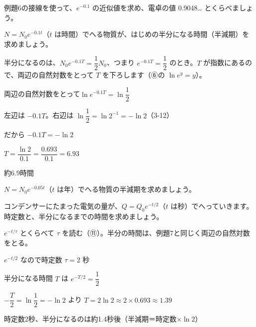 \begin{jibun}
例題6の接線を使って、$e^{-0.1}$ の近似値を求め、電卓の値 0.9048… とくらべましょう。
\end{jibun}

\begin{reidai}[半減期]
$N=N_0e^{-0.1t}$（$t$ は時間）でへる物質が、はじめの半分になる時間（半減期）を求めましょう。\par{}
\kangaekata 半分になるのは、$N_0e^{-0.1T}=\dfrac{1}{2}N_0$、つまり $e^{-0.1T}=\dfrac{1}{2}$ のとき。$T$ が指数にあるので、両辺の自然対数をとって $T$ を下ろします（⑥の $\ln e^y=y$）。\par
\shiki 両辺の自然対数をとって\quad $\ln e^{-0.1T}=\ln\dfrac{1}{2}$\par
\hspace*{2.6\zw}左辺は $-0.1T$。右辺は $\ln\dfrac{1}{2}=\ln2^{-1}=-\ln2$（3-12）\par
\hspace*{2.6\zw}だから $-0.1T=-\ln2$\par
\hspace*{2.6\zw}$T=\dfrac{\ln2}{0.1}=\dfrac{0.693}{0.1}=6.93$\par
\kotae 約6.9時間
\end{reidai}

\begin{jibun}
$N=N_0e^{-0.05t}$（$t$ は年）でへる物質の半減期を求めましょう。
\end{jibun}

\begin{reidai}[時定数]
コンデンサーにたまった電気の量が、$Q=Q_0e^{-t/2}$（$t$ は秒）でへっていきます。時定数と、半分になるまでの時間を求めましょう。\par
\kangaekata $e^{-t/\tau}$ とくらべて $\tau$ を読む（⑪）。半分の時間は、例題7と同じく両辺の自然対数をとる。\par
\shiki $e^{-t/2}$ なので時定数 $\tau=2$ 秒\par
\hspace*{2.6\zw}半分になる時間 $T$ は $e^{-T/2}=\dfrac{1}{2}$\par
\hspace*{2.6\zw}$-\dfrac{T}{2}=\ln\dfrac{1}{2}=-\ln2$ より $T=2\ln2\approx2\times0.693\approx1.39$\par
\kotae 時定数2秒、半分になるのは約1.4秒後（半減期＝時定数×$\ln2$）
\end{reidai}

